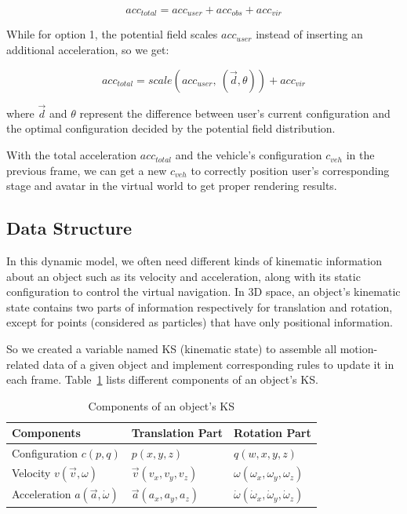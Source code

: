 \begin{equation}
acc_{total}=acc_{user}+acc_{obs}+acc_{vir}
\end{equation}

While for option 1, the potential field scales $acc_{user}$ instead of inserting an additional acceleration, so we get:

\begin{equation}
acc_{total}=scale(acc_{user},\: (\overrightarrow{d},\theta))+acc_{vir}
\end{equation}

where $\overrightarrow{d}$ and $\theta$ represent the difference between user's current configuration and the optimal configuration decided by the potential field distribution.

With the total acceleration $acc_{total}$ and the vehicle's configuration $c_{veh}$ in the previous frame, we can get a new $c_{veh}$ to correctly position user's corresponding stage and avatar in the virtual world to get proper rendering results.


\subsection{Data Structure}
In this dynamic model, we often need different kinds of kinematic information about an object such as its velocity and acceleration, along with its static configuration to control the virtual navigation. In 3D space, an object's kinematic state contains two parts of information respectively for translation and rotation, except for points (considered as particles) that have only positional information. 

So we created a variable named KS (kinematic state) to assemble all motion-related data of a given object and implement corresponding rules to update it in each frame. Table~\ref{tab:5_ks_components} lists different components of an object's KS.

\begin{table}[hbt]
\renewcommand{\arraystretch}{1.3}
\caption{Components of an object's KS}
\label{tab:5_ks_components}
\centering
\begin{tabular}{l l l}
  \hline
  Components & Translation Part & Rotation Part \\
  \hline
  Configuration $c(p, q)$ & $p(x, y, z)$ & $q(w, x, y, z)$ \\
  Velocity $v(\overrightarrow{v}, \omega)$ & $\overrightarrow{v}(v_{x}, v_{y}, v_{z})$ & $\omega(\omega_{x},\omega_{y},\omega_{z})$ \\
  Acceleration $a(\overrightarrow{a}, \dot{\omega})$ & $\overrightarrow{a}(a_{x}, a_{y}, a_{z})$ & $\dot{\omega}(\dot{\omega}_{x},\dot{\omega}_{y},\dot{\omega}_{z})$ \\
  \hline
\end{tabular}
\end{table}

